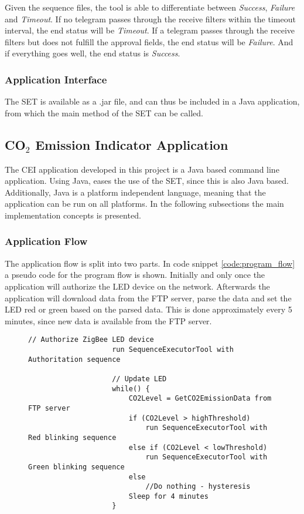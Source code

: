 \documentclass[Main]{subfiles}
\begin{document}
			Given the sequence files, the tool is able to differentiate between \emph{Success}, \emph{Failure} and \emph{Timeout}.
			If no telegram passes through the receive filters within the timeout interval, the end status will be \emph{Timeout}.
			If a telegram passes through the receive filters but does not fulfill the approval fields, the end status will be \emph{Failure}.
			And if everything goes well, the end status is \emph{Success}.

		\subsubsection{Application Interface}
			The SET is available as a .jar file, and can thus be included in a Java application, from which the main method of the SET can be called.

	\newpage
	\subsection{CO$_2$ Emission Indicator Application}
		The CEI application developed in this project is a Java based command line application. 
		Using Java, eases the use of the SET, since this is also Java based. 
		Additionally, Java is a platform independent language, meaning that the application can be run on all platforms. 
		In the following subsections the main implementation concepts is presented.

		\subsubsection{Application Flow}
		\label{sub:application_flow}
			The application flow is split into two parts. 
			In code snippet \ref{code:program_flow} a pseudo code for the program flow is shown.
			Initially and only once the application will authorize the LED device on the network.
			Afterwards the application will download data from the FTP server, parse the data and set the LED red or green based on the parsed data.
			This is done approximately every 5 minutes, since new data is available from the FTP server.

			\begin{figure}[H]
				\begin{lstlisting}[caption=Program Flow, style=Code-C, label=code:program_flow]
					// Authorize ZigBee LED device
					run SequenceExecutorTool with Authoritation sequence

					// Update LED
					while() {
						CO2Level = GetCO2EmissionData from FTP server
						if (CO2Level > highThreshold)
							run SequenceExecutorTool with Red blinking sequence
						else if (CO2Level < lowThreshold)
							run SequenceExecutorTool with Green blinking sequence
						else
							//Do nothing - hysteresis
						Sleep for 4 minutes
					}
				\end{lstlisting}
			\end{figure}
				
\end{document}
